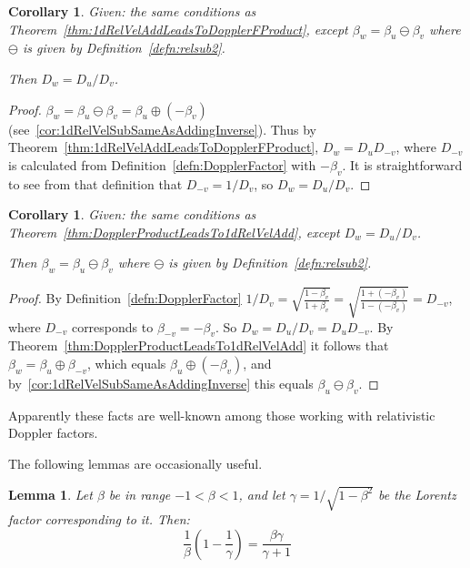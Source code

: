 \documentclass[a4paper]{article}
\theoremstyle{plain}
\newtheorem{corollary}[theorem]{Corollary}
\newtheorem{lemma}[theorem]{Lemma}
\theoremstyle{definition}
\begin{document}
\begin{corollary}
\label{cor:1dRelVelSubLeadsToDopplerQuotient}
Given: the same conditions as
Theorem~\ref{thm:1dRelVelAddLeadsToDopplerFProduct},
except $\beta_w = \beta_u \ominus \beta_v$ where $\ominus$ is given by
Definition~\eqref{defn:relsub2}.

Then $D_w = D_u / D_v$.
\end{corollary}

\begin{proof}
$\beta_w = \beta_u \ominus \beta_v = \beta_u \oplus (-\beta_v)$
(see~\eqref{cor:1dRelVelSubSameAsAddingInverse}).
Thus by Theorem~\ref{thm:1dRelVelAddLeadsToDopplerFProduct},
$D_w = D_u D_{-v}$, where $D_{-v}$ is calculated from
Definition~\eqref{defn:DopplerFactor} with $-\beta_v$.
It is straightforward to see from that definition that
$D_{-v} = 1/D_v$, so $D_w = D_u / D_v$.
\end{proof}

\begin{corollary}
\label{cor:DopplerQuotientLeadsTo1dRelVelSub}
Given: the same conditions as
Theorem~\ref{thm:DopplerProductLeadsTo1dRelVelAdd},
except $D_w = D_u / D_v$.

Then $\beta_w = \beta_u \ominus \beta_v$
where $\ominus$ is given by Definition~\eqref{defn:relsub2}.
\end{corollary}

\begin{proof}
By Definition~\eqref{defn:DopplerFactor}
$1/D_v = \sqrt{ \frac{1-\beta_v}{1+\beta_v} } = \sqrt{ \frac{1+(-\beta_v)}{1-(-\beta_v)} } = D_{-v}$,
where $D_{-v}$ corresponds to $\beta_{-v} = -\beta_v$.
So $D_w = D_u / D_v = D_u D_{-v}$.
By Theorem~\ref{thm:DopplerProductLeadsTo1dRelVelAdd}
it follows that $\beta_w = \beta_u \oplus \beta_{-v}$,
which equals $\beta_u \oplus (-\beta_v)$,
and by~\eqref{cor:1dRelVelSubSameAsAddingInverse} this equals
$\beta_u \ominus \beta_v$.
\end{proof}

Apparently these facts are well-known among those working with
relativistic Doppler factors.

The following lemmas are occasionally useful.
\begin{lemma}
\label{lem:betaGammaIdentity1}
Let $\beta$ be in range $-1 < \beta < 1$,
and let $\gamma = 1/\sqrt{1-\beta^2}$ be the Lorentz factor
corresponding to it.
Then:
\begin{equation}
\frac{1}{\beta} (1-\frac{1}{\gamma}) = \frac{\beta\gamma}{\gamma+1}
\end{equation}
\end{lemma}
\end{document}
